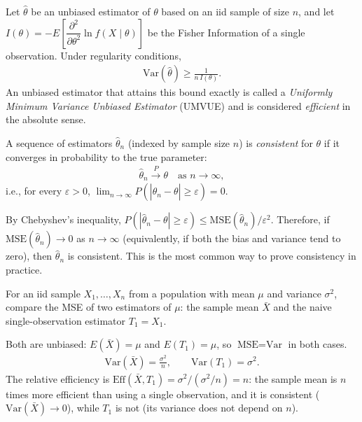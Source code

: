 \begin{teorema}
 \label{eq:6.1.5}
Let $\hat{\theta}$ be an unbiased estimator of $\theta$ based on an iid sample of size $n$, and let $I(\theta) = -E\left[\dfrac{\partial^2}{\partial\theta^2}\ln f(X\mid\theta)\right]$ be the Fisher Information of a single observation. Under regularity conditions,
\begin{align}
 \text{Var}(\hat{\theta}) \geq \frac{1}{n\,I(\theta)}.
\end{align}
An unbiased estimator that attains this bound exactly is called a \emph{Uniformly Minimum Variance Unbiased Estimator} (UMVUE) and is considered \emph{efficient} in the absolute sense.
\end{teorema}

\begin{definicion}[Consistency]
 \label{eq:6.1.6}
A sequence of estimators $\hat{\theta}_n$ (indexed by sample size $n$) is \emph{consistent} for $\theta$ if it converges in probability to the true parameter:
\begin{align}
 \hat{\theta}_n \xrightarrow{P} \theta \quad \text{as } n \to \infty,
\end{align}
i.e., for every $\varepsilon > 0$, $\lim_{n\to\infty} P(|\hat{\theta}_n - \theta| \geq \varepsilon) = 0$.
\end{definicion}

\begin{observacion}
By Chebyshev's inequality, $P(|\hat{\theta}_n-\theta|\ge\varepsilon) \le \text{MSE}(\hat{\theta}_n)/\varepsilon^2$. Therefore, if $\text{MSE}(\hat{\theta}_n) \to 0$ as $n\to\infty$ (equivalently, if both the bias and variance tend to zero), then $\hat{\theta}_n$ is consistent. This is the most common way to prove consistency in practice.
\end{observacion}

\begin{ejemplo}
 \label{exmp:6.1.1}
For an iid sample $X_1,\ldots,X_n$ from a population with mean $\mu$ and variance $\sigma^2$, compare the MSE of two estimators of $\mu$: the sample mean $\bar{X}$ and the naive single-observation estimator $T_1 = X_1$.
\end{ejemplo}

\begin{solucion}
Both are unbiased: $E(\bar{X})=\mu$ and $E(T_1)=\mu$, so $\text{MSE}=\text{Var}$ in both cases.
\begin{align}
 \text{Var}(\bar{X}) = \frac{\sigma^2}{n}, \qquad \text{Var}(T_1) = \sigma^2.
\end{align}
The relative efficiency is $\text{Eff}(\bar{X}, T_1) = \sigma^2/(\sigma^2/n) = n$: the sample mean is $n$ times more efficient than using a single observation, and it is consistent ($\text{Var}(\bar{X})\to 0$), while $T_1$ is not (its variance does not depend on $n$).
\end{solucion}

